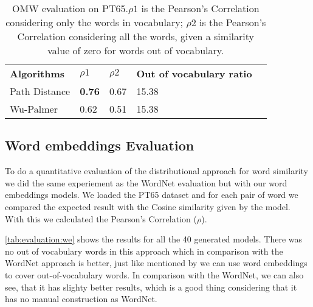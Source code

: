 \begin{table}[h]
    \caption{OMW evaluation on PT65.\textbf{$\rho1$} is the Pearson’s Correlation considering only the words in vocabulary; \textbf{$\rho2$} is the Pearson’s Correlation considering all the words, given a similarity value of zero for words out of vocabulary. }
    \label{tab:worneteval}
    \centering%
    \begin{minipage}{.6\textwidth}
    \begin{tabular}{@{}lllll@{}}
    \cmidrule(r){1-5}
    \textbf{Algorithms} & \textbf{$\rho1$} & \textbf{$\rho2$}         & \textbf{Out of vocabulary ratio} \\ 
    \cmidrule(r){1-4}
    Path Distance & \textbf{0.76} & 0.67   & 15.38                   \\
    Wu-Palmer     & 0.62    & 0.51         & 15.38                   \\ \cmidrule(r){1-4}
    \end{tabular}
    \end{minipage}
\end{table}









\subsection{Word embeddings Evaluation}\label{chap:results:we}

To do a quantitative evaluation of the distributional approach for word similarity we did the same experiement as the WordNet evaluation but with our word embeddings models.
We loaded the PT65 dataset and for each pair of word we compared the expected result with the Cosine similarity given by the model. With this we calculated the Pearson’s Correlation ($\rho$).

\autoref{tab:evaluation:we} shows the results for all the 40 generated models. There was no out of vocabulary words in this approach which in comparison with the WordNet approach is better, just like mentioned by  we can use word embeddings to cover out-of-vocabulary words. In comparison with the WordNet, we can also see, that it has slighty better results, which is a good thing considering that it has no manual construction as WordNet.

